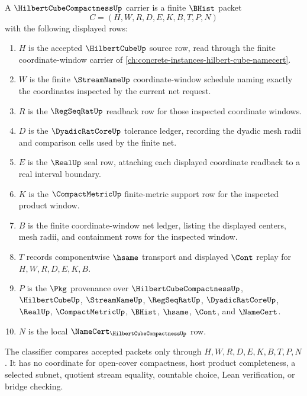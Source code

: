 \begin{definition}
\label{def:hilbert-cube-compactness-carrier}
A $\HilbertCubeCompactnessUp$ carrier is a finite $\BHist$ packet
$$
C=(H,W,R,D,E,K,B,T,P,N)
$$
with the following displayed rows:
\begin{enumerate}
\item $H$ is the accepted $\HilbertCubeUp$ source row, read through the finite coordinate-window carrier of \autoref{ch:concrete-instances-hilbert-cube-namecert}.
\item $W$ is the finite $\StreamNameUp$ coordinate-window schedule naming exactly the coordinates inspected by the current net request.
\item $R$ is the $\RegSeqRatUp$ readback row for those inspected coordinate windows.
\item $D$ is the $\DyadicRatCoreUp$ tolerance ledger, recording the dyadic mesh radii and comparison cells used by the finite net.
\item $E$ is the $\RealUp$ seal row, attaching each displayed coordinate readback to a real interval boundary.
\item $K$ is the $\CompactMetricUp$ finite-metric support row for the inspected product window.
\item $B$ is the finite coordinate-window net ledger, listing the displayed centers, mesh radii, and containment rows for the inspected window.
\item $T$ records componentwise $\hsame$ transport and displayed $\Cont$ replay for $H,W,R,D,E,K,B$.
\item $P$ is the $\Pkg$ provenance over $\HilbertCubeCompactnessUp$, $\HilbertCubeUp$, $\StreamNameUp$, $\RegSeqRatUp$, $\DyadicRatCoreUp$, $\RealUp$, $\CompactMetricUp$, $\BHist$, $\hsame$, $\Cont$, and $\NameCert$.
\item $N$ is the local $\NameCert_{\HilbertCubeCompactnessUp}$ row.
\end{enumerate}
The classifier compares accepted packets only through $H,W,R,D,E,K,B,T,P,N$. It has no coordinate for open-cover compactness, host product completeness, a selected subnet, quotient stream equality, countable choice, Lean verification, or bridge checking.
\end{definition}

